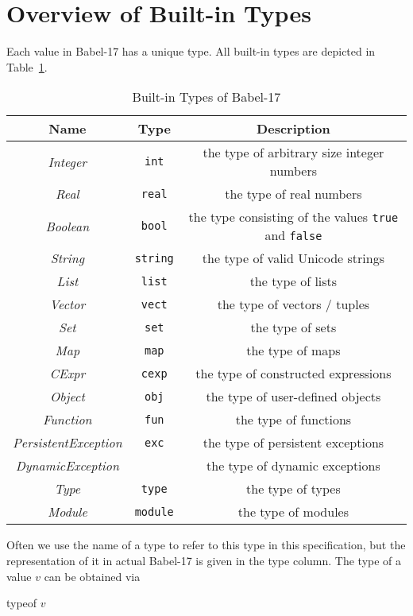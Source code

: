 \documentclass[11pt]{amsart}
\newcommand{\metababel}[1] {\textsl{#1}}
\newcommand{\babelsrc}[1] {\lstinline!#1!}
\begin{document}
\section{Overview of Built-in Types}
Each value in Babel-17 has a unique type. All built-in types are depicted in Table~\ref{table:builtintypes}.
\begin{table}
\caption{Built-in Types of Babel-17}
\begin{tabular}{c|c|c}
\textbf{Name} & \textbf{Type} & \textbf{Description}\\\hline
\metababel {Integer} & \verb+int+ & the type of arbitrary size integer numbers\\
\metababel {Real} & \verb+real+ & the type of real numbers\\
\metababel{Boolean} & \verb+bool+ &  the type consisting of the values \babelsrc{true} and \babelsrc{false}\\
\metababel{String} & \verb+string+ &  the type of valid Unicode strings\\
\metababel{List} & \verb+list+&  the type of lists\\
\metababel{Vector} & \verb+vect+ &  the type of vectors / tuples\\
\metababel{Set} & \verb+set+ &  the type of sets \\
\metababel{Map}& \verb+map+ &  the type of maps \\
\metababel{CExpr} & \verb+cexp+ &  the type of constructed expressions\\
\metababel{Object} & \verb+obj+ &  the type of user-defined objects\\
\metababel{Function} & \verb+fun+ &  the type of  functions\\
\metababel{PersistentException} & \verb+exc+ &  the type of persistent exceptions\\
\metababel{DynamicException} & &  the type of dynamic exceptions\\
\metababel{Type} &  \verb+type+ &  the type of types\\
\metababel{Module} &  \verb+module+ &  the type of modules\\
\end{tabular}
\label{table:builtintypes}
\end{table}
Often we use the name of a type to refer to this type in this specification, but the representation of it in actual Babel-17 is given in the type column. 
The type of a value $v$ can be obtained via 
\begin{babellisting}
typeof $v$
\end{babellisting}
\end{document}
